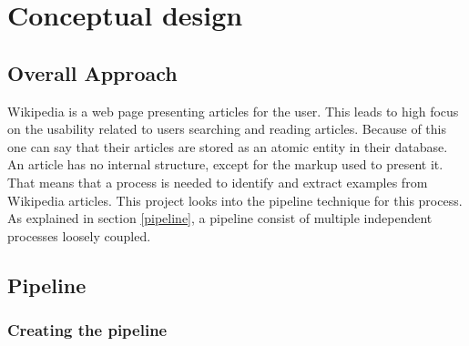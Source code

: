 
\chapter{Conceptual design}

\section{Overall Approach}

Wikipedia is a web page presenting articles for the user. This leads to high focus on the usability related to users searching and reading articles. Because of this one can say that their articles are stored as an atomic entity in their database. An article has no internal structure, except for the markup used to present it. That means that a process is needed to identify and extract examples from Wikipedia articles. This 
project %
looks into the pipeline technique for this process. As explained in section \ref{pipeline}, a pipeline consist of multiple independent processes loosely coupled.\\



\section{Pipeline} \label{cd_pipeline}

\subsection{Creating the pipeline} \label{custom-pipeline}

